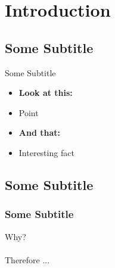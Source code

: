 \section{Introduction}
\subsection{Some Subtitle}
\begin{frame}{Some Subtitle}
\begin{center}
    \begin{itemize}
        \item[] \textbf{Look at this:}
        \item Point
        \item[] \textbf{And that:}
        \item Interesting fact
    \end{itemize}
\end{center}
\end{frame}
%
%
\subsection{Some Subtitle}
\begin{frame}
\frametitle{Some Subtitle}
\begin{center}
    Why?
    \pause
    \\~\\
    Therefore ...
\end{center}
\end{frame}
%
